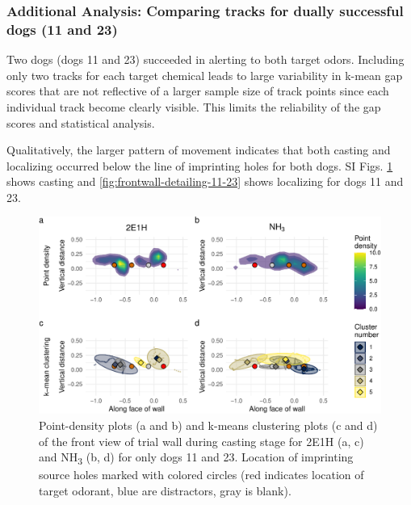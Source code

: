 \documentclass[
]{article}
\begin{document}
\newpage

\hypertarget{additional-analysis-comparing-tracks-for-dually-successful-dogs-11-and-23}{%
\subsubsection{Additional Analysis: Comparing tracks for dually successful dogs (11 and 23)}\label{additional-analysis-comparing-tracks-for-dually-successful-dogs-11-and-23}}

Two dogs (dogs 11 and 23) succeeded in alerting to both target odors. Including only two tracks for each target chemical leads to large variability in k-mean gap scores that are not reflective of a larger sample size of track points since each individual track become clearly visible. This limits the reliability of the gap scores and statistical analysis.

Qualitatively, the larger pattern of movement indicates that both casting and localizing occurred below the line of imprinting holes for both dogs. SI Figs. \ref{fig:frontwall-casting-11-23} shows casting and \ref{fig:frontwall-detailing-11-23} shows localizing for dogs 11 and 23.

\begin{figure}
\centering
\includegraphics{supplementary-info_files/figure-latex/frontwall-casting-11-23-1.pdf}
\caption{\label{fig:frontwall-casting-11-23}Point-density plots (a and b) and k-means clustering plots (c and d) of the front view of trial wall during casting stage for 2E1H (a, c) and NH\textsubscript{3} (b, d) for only dogs 11 and 23. Location of imprinting source holes marked with colored circles (red indicates location of target odorant, blue are distractors, gray is blank).}
\end{figure}
\end{document}
